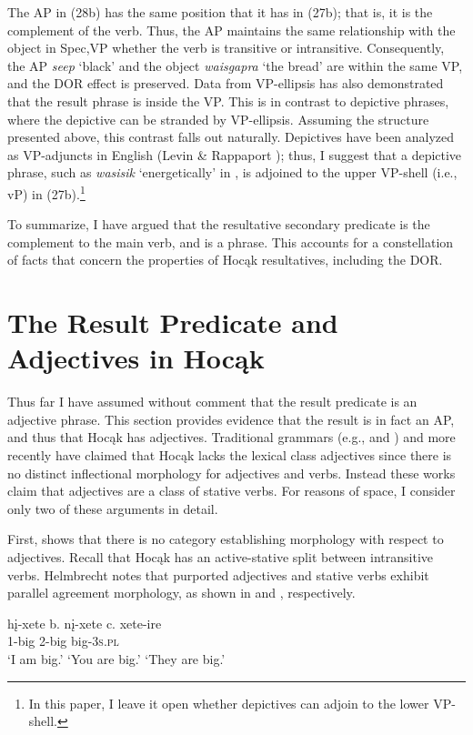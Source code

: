 \documentclass[output=paper]{LSP/langsci}
\begin{document}
The AP in (28b) has the same position that it has in (27b); that is, it is the complement of the verb. Thus, the AP maintains the same relationship with the object in Spec,VP whether the verb is transitive or intransitive. Consequently, the AP \textit{seep} `black' and the object \textit{waisgapra} `the bread' are within the same VP, and the DOR effect is preserved. Data from VP-ellipsis has also demonstrated that the result phrase is inside the VP. This is in contrast to depictive phrases, where the depictive can be stranded by VP-ellipsis. Assuming the structure presented above, this contrast falls out naturally. Depictives have been analyzed as VP-adjuncts in English (Levin \& Rappaport \citealt{Hovav1995}); thus, I suggest that a depictive phrase, such as \textit{wasisik} `energetically' in , is adjoined to the upper VP-shell (i.e., vP) in (27b).\footnote{In this paper, I leave it open whether depictives can adjoin to the lower VP-shell.}

To summarize, I have argued that the resultative secondary predicate is the complement to the main verb, and is a phrase. This accounts for a constellation of facts that concern the properties of Hocąk resultatives, including the DOR.

\section{The Result Predicate and Adjectives in Hocąk} \label{sec:rosen:5}

Thus far I have assumed without comment that the result predicate is an adjective phrase. This section provides evidence that the result is in fact an AP, and thus that Hocąk has adjectives. Traditional grammars (e.g., \citealt{Lipkind1945} and \citealt{Susman1943}) and more recently \citet{Helmbrecht2006} have claimed that Hocąk lacks the lexical class adjectives since there is no distinct inflectional morphology for adjectives and verbs. Instead these works claim that adjectives are a class of stative verbs. For reasons of space, I consider only two of these arguments in detail.

First, \citet{Helmbrecht2006} shows that there is no category establishing morphology with respect to adjectives. Recall that Hocąk has an active-stative split between intransitive verbs. Helmbrecht notes that purported adjectives and stative verbs exhibit parallel agreement morphology, as shown in  and , respectively.

\begin{exe}
\ex\label{ex:rosen:29}
\begin{xlist}
\ex \gll
hį-xete \hspace{36pt} b. {}  nį-xete \hspace{48pt} c. {} xete-ire\\
1-big {} {} {} 2-big {} {}  {} big-\textsc{3s.pl}\\
\glt `I am big.' \hspace{1.2cm} `You are big.' \hspace{1.1cm} `They are big.'

\end{xlist}
\end{exe}
\end{document}
